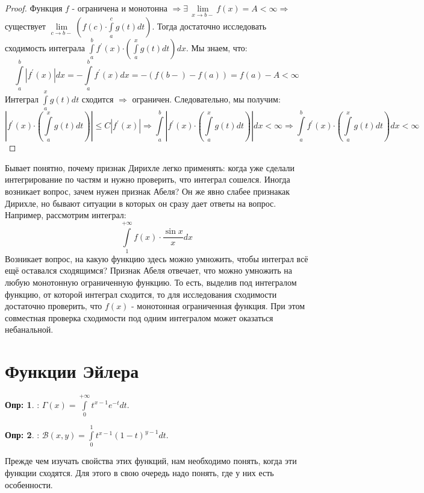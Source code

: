 \documentclass[12pt]{article}
\newcommand{\MB}{\mathcal{B}}
\theoremstyle{definition}
\newtheorem{defn}{Опр:}
\newcommand{\ddint}[2]{\displaystyle\int\limits_{#1}^{#2}}
\begin{document}
\begin{proof}
	Функция $f$ - ограничена и монотонна $\Rightarrow \exists \, \lim\limits_{x \to b-}f(x) = A < \infty \Rightarrow$ существует $\lim\limits_{c \to b-}\left(f(c){\cdot\!\!}\ddint{a}{c}g(t)dt\right)$. Тогда достаточно исследовать сходимость интеграла $\ddint{a}{b}f^\prime(x){\cdot\!\!}\left(\ddint{a}{x}g(t)dt\right)dx$. Мы знаем, что: 
	$$
		\ddint{a}{b}\left|f^\prime(x)\right|dx = - \ddint{a}{b}f^\prime(x)dx = -\left(f(b-) - f(a)\right) = f(a) - A < \infty
	$$
	Интеграл $\ddint{a}{x}g(t)dt$ сходится $\Rightarrow$ ограничен. Следовательно, мы получим:
	$$
		\left|f^\prime(x){\cdot\!\!}\left(\ddint{a}{x}g(t)dt\right)\right| \leq C\left|f^\prime(x)\right| \Rightarrow \ddint{a}{b}\left|f^\prime(x){\cdot\!\!}\left(\ddint{a}{x}g(t)dt\right)\right|dx < \infty \Rightarrow \ddint{a}{b}f^\prime(x){\cdot\!\!}\left(\ddint{a}{x}g(t)dt\right)dx < \infty
	$$
	
\end{proof}


Бывает понятно, почему признак Дирихле легко применять: когда уже сделали интегрирование по частям и нужно проверить, что интеграл сошелся. Иногда возникает вопрос, зачем нужен признак Абеля? Он же явно слабее признакак Дирихле, но бывают ситуации в которых он сразу дает ответы на вопрос. Например, рассмотрим интеграл:
$$
	\ddint{1}{+\infty}f(x){\cdot}\dfrac{\sin{x}}{x}dx
$$
Возникает вопрос, на какую функцию здесь можно умножить, чтобы интеграл всё ещё оставался сходящимся? Признак Абеля отвечает, что можно умножить на любую монотонную ограниченную функцию. То есть, выделив под интегралом функцию, от которой интеграл сходится, то для исследования сходимости достаточно проверить, что $f(x)$ - монотонная ограниченная функция. При этом совместная проверка сходимости под одним интегралом может оказаться небанальной.
\newpage
\section*{Функции Эйлера}
\begin{defn}
	: $\Gamma(x) = \ddint{0}{+\infty}t^{x-1}e^{-t}dt$.
\end{defn}
\begin{defn}
	: $\MB(x,y) = \ddint{0}{1}t^{x-1}(1-t)^{y-1}dt$.
\end{defn}
Прежде чем изучать свойства этих функций, нам необходимо понять, когда эти функции сходятся. Для этого в свою очередь надо понять, где у них есть особенности. 
\end{document}
